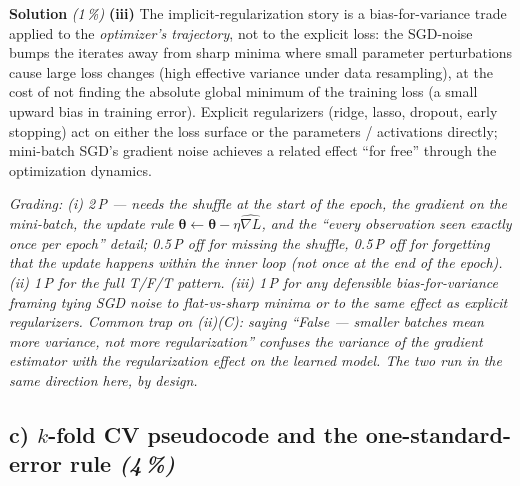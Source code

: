\documentclass[11pt,a4paper]{article}
\newcommand{\subpoints}[1]{\textit{(#1\,\%)}}
\newcommand{\sol}{\noindent\textbf{Solution}}
\begin{document}
\medskip
\sol{} \subpoints{1} \textbf{(iii)} The implicit-regularization story is a bias-for-variance trade
applied to the \emph{optimizer's trajectory}, not to the explicit loss: the SGD-noise bumps the
iterates away from sharp minima where small parameter perturbations cause large loss changes
(high effective variance under data resampling), at the cost of not finding the absolute global
minimum of the training loss (a small upward bias in training error). Explicit regularizers (ridge,
lasso, dropout, early stopping) act on either the loss surface or the parameters / activations
directly; mini-batch SGD's gradient noise achieves a related effect ``for free'' through the
optimization dynamics.

\noindent\emph{Grading: (i) 2\,P --- needs the shuffle at the start of the epoch, the gradient
on the mini-batch, the update rule $\boldsymbol\theta \leftarrow \boldsymbol\theta - \eta\widehat{\nabla L}$, and the
``every observation seen exactly once per epoch'' detail; 0.5\,P off for missing the shuffle, 0.5\,P
off for forgetting that the update happens \emph{within} the inner loop (not once at the end of the
epoch). (ii) 1\,P for the full T/F/T pattern. (iii) 1\,P for any defensible
bias-for-variance framing tying SGD noise to flat-vs-sharp minima or to the same effect as explicit
regularizers. Common trap on (ii)(C): saying ``False --- smaller batches mean more variance, not
more regularization'' confuses the variance of the gradient estimator with the regularization effect
on the learned model. The two run in the same direction here, by design.}

\subsection*{c) $k$-fold CV pseudocode and the one-standard-error rule \subpoints{4}}
\end{document}
